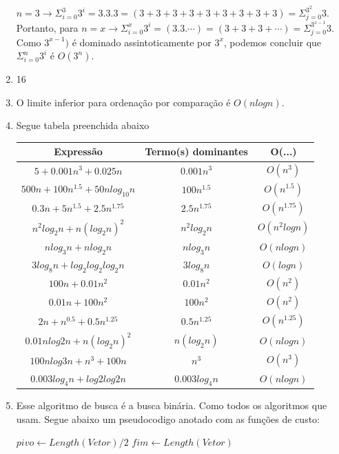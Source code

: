 \documentclass[11pt]{article}
\begin{document}
\begin{enumerate}
$n = 3 \rightarrow \Sigma_{i=0}^3 3^i = 3.3.3 = (3+3+3+3+3+3+3+3+3) = \Sigma_{j=0}^{3^2} 3$. Portanto, para 
$n = x \rightarrow \Sigma_{i=0}^x 3^i = (3.3.\dotsm)= (3+3+3+\dotsm) = \Sigma_{j=0}^{3^{x-1}} 3$.
Como $3^{x-1})$ é dominado assintoticamente por $3^x$, podemos concluir que $\Sigma_{i=0}^n 3^i$ é $O(3^n)$.
    \item 16
    \item O limite inferior para ordenação por comparação é $O(n logn)$.
    \item  Segue tabela preenchida abaixo \\
        \begin{tabular}{|c|c|c|}
        Express\~ao & Termo(s) dominantes & O(...) \\ \hline
        $5 + 0.001n^3 + 0.025n$ & $0.001n^3$ & $O(n^3)$ \\ \hline
        $500n + 100n^{1.5} + 50n log_{10} n$ & $100n^{1.5}$ & $O(n^{1.5})$ \\ \hline
        $0.3n + 5n^{1.5} + 2.5n^{1.75}$ & $2.5n^{1.75}$ & $O(n^{1.75})$ \\ \hline
        $n^2 log_2 n + n(log_2 n)^2$ & $n^2 log_2 n$ & $O(n^2 log n)$ \\ \hline
        $n log_3 n + n log_2 n$ & $n log_3n$ & $O(nlogn)$ \\ \hline
        $3 log_8 n + log_2 log_2 log_2 n$ & $3log_8n$ & $O(logn)$ \\ \hline
        $100n + 0.01n^2$ & $0.01n^2$ & $O(n^2)$ \\ \hline
        $0.01n + 100n^2$ & $100n^2$ & $O(n^2) $ \\ \hline
        $2n + n^{0.5} + 0.5n^{1.25} $ & $0.5n^{1.25}$ & $O(n^{1.25})$ \\ \hline
        $0.01n log2 n + n(log_2 n)^2$ & $n(log_2 n) $ & $O(nlogn)$ \\ \hline
        $100nlog3n + n^3 + 100n$ & $n^3$ & $O(n^3)$ \\ \hline
        $0.003 log_4 n + log2 log2 n$ & $0.003 log_4 n$ & $O(nlogn)$ \\ \hline  
        \end{tabular}
    \item Esse algoritmo de busca é a busca binária. Como todos os algoritmos que usam. Segue abaixo um pseudocodigo anotado com as funções de custo:
        \begin{algorithmic}[1]
                \State $pivo \gets Length(Vetor)/2$ 
                \State $fim \gets Length(Vetor)$ 

\end{algorithmic}
\end{enumerate}
\end{document}
